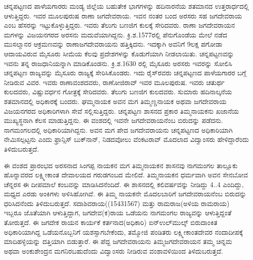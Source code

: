 ಚನ್ನಪಟ್ಟಣದ ಪಾಳೆಯಗಾರರು ಮಂಡ್ಯ ಜಿಲ್ಲೆಯ ಬಹುತೇಕ ಭಾಗಗಳನ್ನು ಹದಿನಾರನೆಯ ಶತಮಾನದ ಉತ್ತರಾರ್ಧದಲ್ಲಿ ಆಳುತ್ತಿದ್ದರು. ಇವರ ಮೂಲಪುರುಷ ರಾಣಾ ಜಗದೇವರಾಯ. ಇವನ ನಂತರ ಬಂದ ಅರಸರು ಸಹ ಜಗದೇವರಾಯ ಎಂಬ ಹೆಸರನ್ನು ಇಟ್ಟುಕೊಳ್ಳುತ್ತಿದ್ದರು. ಇವರು ತೆಲುಗು ಬಣಜಿಗ ಕುಲಕ್ಕೆ ಸೇರಿದವರು. ರಾಣಾ ಜಗದೇವರಾಯನ ಮಗಳನ್ನು ವಿಜಯನಗರದ ಅರಸನು ಮದುವೆಯಾಗಿದ್ದನು. ಕ್ರಿ.ಶ.1577ರಲ್ಲಿ ಪೆನುಗೊಂಡೆಯ ಮೇಲೆ ನಡೆದ ಮುಸಲ್ಮಾನರ ಆಕ್ರಮಣವನ್ನು ರಾಣಾಜಗದೇವರಾಯನು ಹತ್ತಿಕ್ಕಿದನು. ಇದಕ್ಕಾಗಿ ಅವನಿಗೆ 9ಲಕ್ಷ ಪಗೋಡಾ ಆದಾಯವಿರುವ ಮೈಸೂರು ಸೀಮೆಯ ಕೆಲವು ಪ್ರದೇಶಗಳನ್ನು ಕೊಡುಗೆಯಾಗಿ ನೀಡಲಾಯಿತು. ಚನ್ನಪಟ್ಟಣವನ್ನು ಇವನು ತನ್ನ ರಾಜಧಾನಿಯನ್ನಾಗಿ ಮಾಡಿಕೊಂಡನು. ಕ್ರಿ.ಶ.1630 ರಲ್ಲಿ ಮೈಸೂರು ಅರಸರು ಇವರನ್ನು ಸೋಲಿಸಿ ಚನ್ನಪಟ್ಟಣ ರಾಜ್ಯವನ್ನು ಮೈಸೂರು ರಾಜ್ಯಕ್ಕೆ ಸೇರಿಸಿಕೊಂಡರು. ಇದು ರೈಸ್​ರವರು ಚನ್ನಪಟ್ಟಣದ ಪಾಳೆಯಗಾರರ ಬಗ್ಗೆ ನೀಡಿರುವ ವಿವರ. ಇವರು ರಾಣಾವಂಶದವರು, ರಾಣೋಜಿರಾವ್​ ಇವರ ಮೂಲಪುರುಷ. ಇವರು ಚತುರ್ಥ ಕುಲದವರು, ವಿಷ್ಣುವರ್ಧನ ಗೋತ್ರಕ್ಕೆ ಸೇರಿದವರು. ತೆಲುಗು ಬಣಜಿಗ ಕುಲದವರು. ಸುಮಾರು ಹದಿನಾಲ್ಕನೆಯ ಶತಮಾನದಲ್ಲಿ ಅಧಿಕಾರಕ್ಕೆ ಬಂದರು. ಘಮ್ಮನಾಯಕ ಅವನ ಮಗ ತಿಮ್ಮಣ್ಣನಾಯಕ ಅಥವಾ ಜಗದೇವರಾಯ ವಿಜಯನಗರದ ಅಧಿಕಾರಿಗಳಾಗಿ ಸೇವೆ ಸಲ್ಲಿಸುತ್ತಿದ್ದರು. ಚನ್ನಪಟ್ಟಣ ಶಾಸನದ ಪ್ರಕಾರ ತಿಮ್ಮನಾಯಕನು ಖಜಾನೆಯ ಮುಖ್ಯಸ್ಥನಾಗಿ ಕೆಲಸ ಮಾಡುತ್ತಿದ್ದನು. ಈ ವಂಶದಲ್ಲಿ ಇವನೇ ಜಗದೇವರಾಯನೆಂಬ ಬಿರುದನ್ನು ಪಡೆದನು. ನಾಗಮಂಗಲದಲ್ಲಿ ಅಧಿಕಾರಿಯಾಗಿದ್ದನು. ಅವನ ಮಗ ಪೇದ ಜಗದೇವರಾಯನು ಚನ್ನಪಟ್ಟಣದ ಅಧಿಕಾರಿಯಾಗಿ ನೇಮಿಸಲ್ಪಟ್ಟನು ಎಂದು ಫ್ರಾನ್ಸಿಸ್​ ಬುಕ್​ನಾನ್​, ನಿಡದವೋಲು ವೆಂಕಟರಾವ್​ ಮೊದಲಾದ ವಿದ್ವಾಂಸರು ಹೇಳಿದ್ದಾರೆಂದು ತಿಳಿದುಬರುತ್ತದೆ.

ಈ ವಂಶದ ಪ್ರಾರಂಭದ ಅರಸನಾದ ಸಿಂಗಪ್ಪ ನಾಯಕನ ಮಗ ತಿಮ್ಮನಾಯಕನ ಶಾಸನವು ನಾಗಮಂಗಲ ತಾಲ್ಲೂಕು ಹೊನ್ನಾವರದ ಲಕ್ಷ್ಮೀಕಾಂತ ದೇವಾಲಯದ ಗರುಡಗಂಬದ ಮೇಲಿದೆ. ತಿಮ್ಮನಾಯಕನ ಧರ್ಮವಾಗಿ ಅವನ ಸೇನಬೋವ ಚೆನ್ನರಸ ಈ ದೀಪಮಾಲೆ ಕಂಬವನ್ನು ಮಾಡಿಸಿದನೆಂದಿದೆ. ಈ ಶಾಸನದಲ್ಲಿ ಕಲಿವರ್ಷವನ್ನು ನೀಡಿದ್ದು 4..4 ಎಂದಿದ್ದು, ಮಧ್ಯದ ಎರಡು ಅಂಕಿಗಳು ಅಳಿಸಿಹೋಗಿವೆ. ಈ ತಿಮ್ಮ ನಾಯಕನೇ ಮೊದಲಬಾರಿಗೆ ಜಗದೇವರಾಯನೆಂಬ ಬಿರುದನ್ನು ಧರಿಸಿದನೆಂದು ತಿಳಿದುಬರುತ್ತದೆ. ಸದಾಶಿವರಾಯ((1543\enginline{-}1567) ಮತ್ತು ರಾಮರಾಜ(ಅಳಿಯ ರಾಮರಾಯ) ಇಬ್ಬರೂ ಜೊತೆಯಾಗಿ ಆಳುತ್ತಿದ್ದಾಗ, ಜಗದೇವ(ಕ)ರಾಯ ಒಡೆಯನು ನಾಗಮಂಗಲ ರಾಜ್ಯವನ್ನು ಆಳುತ್ತಿದ್ದಂತೆ ತೋರುತ್ತದೆ. ಈ ಜಗದೇಕ ರಾಯನ ಕಾರ್ಯಕೆ ಕರ್ತನಾದ(ಅಧಿಕಾರಿ) ಐನ್​\enginline{-}ಉಲ್​\enginline{-}ಮುಲ್ಕ್​ ಬಿರುದಾಂಕಿತ ಅಧಿಕಾರಿಯಾಗಿದ್ದ ಒಡೆಯನೊಬ್ಬನಿಗೆ ಯಶಸ್ಸಾಗಬೇಕೆಂದು, ತಮ್ಮೋಜಿ ಪಂಡಿತರು ಲಕ್ಷ್ಮೀಕಾಂತದೇವರ ನಂದಾದೀಪಕ್ಕೆ ಮಾದಿಹಳ್ಳಿಯನ್ನು ದತ್ತಿಯಾಗಿ ಬಿಡುತ್ತಾರೆ. ಈ ಪೆದ್ದ ಜಗದೇವರಾಯನು ತಿಮ್ಮಜಗದೇವರಾಯನ ತಮ್ಮ ಚಿನ್ನಮ ಅಥವಾ ಅಂಕುಶೇಂದ್ರನ ಮಗನಿರಬಹುದೆಂದು ವಿದ್ವಾಂಸರು ನೀಡಿರುವ ವಂಶಾವಳಿಯಿಂದ ತಿಳಿದುಬರುತ್ತದೆ.

